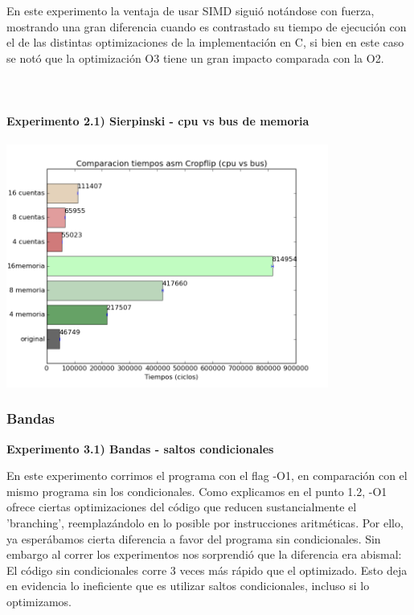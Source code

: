\documentclass[a4paper]{article}
\begin{document}
En este experimento la ventaja de usar SIMD sigui\'{o} not\'{a}ndose con fuerza, mostrando una gran diferencia cuando es contrastado su tiempo de ejecuci\'{o}n con el de las distintas optimizaciones de la implementaci\'{o}n en C, si bien en este caso se not\'{o} que la optimizaci\'{o}n O3 tiene un gran impacto comparada con la O2. \\ \\ \\ \\

\textbf{Experimento 2.1) Sierpinski - cpu vs bus de memoria}\\ \\

\includegraphics[width=300pt]{imagenes/bvmcrop.png}

\newpage

\subsubsection{Bandas}

\textbf{Experimento 3.1) Bandas - saltos condicionales}

En este experimento corrimos el programa con el flag -O1, en comparaci\'{o}n con el mismo programa sin los condicionales. Como explicamos en el punto 1.2, -O1 ofrece ciertas optimizaciones del c\'{o}digo que reducen sustancialmente el 'branching', reemplaz\'{a}ndolo en lo posible por instrucciones aritm\'{e}ticas. Por ello, ya esper\'{a}bamos cierta diferencia a favor del programa sin condicionales. Sin embargo al correr los experimentos nos sorprendi\'{o} que la diferencia era abismal: El c\'{o}digo sin condicionales corre 3 veces m\'{a}s r\'{a}pido que el optimizado. Esto deja en evidencia lo ineficiente que es utilizar saltos condicionales, incluso si lo optimizamos.
\end{document}
